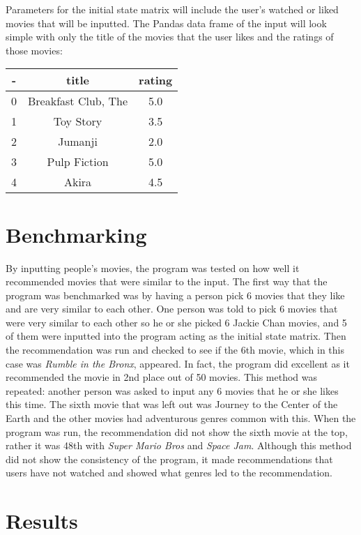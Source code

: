 \documentclass{article}
\begin{document}
Parameters for the initial state matrix will include the user's watched or liked movies that will be inputted. The Pandas data frame of the input
will look simple with only the title of the movies that the user likes and the ratings of those movies:
\begin{center}
\begin{tabular}{||c c c||}
    \hline
    - & title & rating \\ [0.5ex] 
    \hline\hline
    0 & Breakfast Club, The & 5.0 \\ 
    \hline
    1 & Toy Story & 3.5 \\
    \hline
    2 & Jumanji & 2.0 \\
    \hline
    3 & Pulp Fiction & 5.0 \\
    \hline
    4 & Akira & 4.5 \\ [1ex] 
    \hline
\end{tabular}
\end{center}

\section{Benchmarking}
By inputting people's movies, the program was tested on how well it recommended movies that were similar to the input. 
The first way that the program was benchmarked was by having a person pick 6 movies that they like and are very similar to each other.
One person was told to pick 6 movies that were very similar to each other so he or she picked 6 Jackie Chan movies,
and 5 of them were inputted into the program acting as the initial state matrix. Then the 
recommendation was run and checked to see if the 6th movie, which in this case was \emph{Rumble in the Bronx}, appeared. In fact, the 
program did excellent as it recommended the movie in 2nd place out of 50 movies. This method was repeated: another person was asked to input 
any 6 movies that he or she likes this time. The sixth movie that was left out was Journey to the Center of the Earth and the other movies
had adventurous genres common with this. When the program was run, the recommendation did not show the sixth movie at the top, rather it was 48th with
\emph{Super Mario Bros} and \emph{Space Jam}. Although this method did not show the consistency of the program, it made recommendations that users have not watched
and showed what genres led to the recommendation.

\section{Results}
\end{document}
